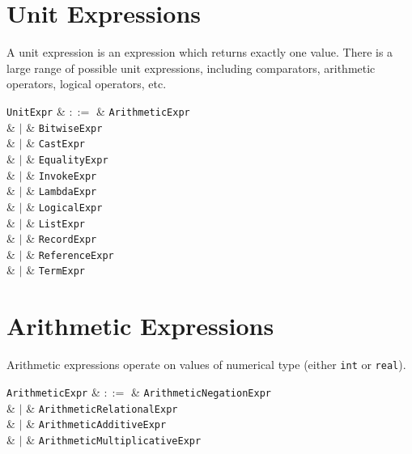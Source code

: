 \section{Unit Expressions}
\label{c_expr_unit}

A unit expression is an expression which returns exactly one value.  There is a large range of possible unit expressions, including comparators, arithmetic operators, logical operators, etc.

\begin{syntax}
  \verb+UnitExpr+ & $::=$ & \verb+ArithmeticExpr+\\
                  &  $|$  & \verb+BitwiseExpr+\\
                  &  $|$  & \verb+CastExpr+\\
                  &  $|$  & \verb+EqualityExpr+\\
                  &  $|$  & \verb+InvokeExpr+\\
                  &  $|$  & \verb+LambdaExpr+\\
                  &  $|$  & \verb+LogicalExpr+\\
                  &  $|$  & \verb+ListExpr+\\
                  &  $|$  & \verb+RecordExpr+\\
                  &  $|$  & \verb+ReferenceExpr+\\
                  &  $|$  & \verb+TermExpr+\\
                
\end{syntax}


\section{Arithmetic Expressions}
\label{c_expr_arithmetic}

Arithmetic expressions operate on values of numerical type (either \lstinline{int} or \lstinline{real}).

\begin{syntax}
  \verb+ArithmeticExpr+ & $::=$ & \verb+ArithmeticNegationExpr+\\
                  &  $|$  & \verb+ArithmeticRelationalExpr+\\
                  &  $|$  & \verb+ArithmeticAdditiveExpr+\\
                  &  $|$  & \verb+ArithmeticMultiplicativeExpr+\\
\end{syntax}

